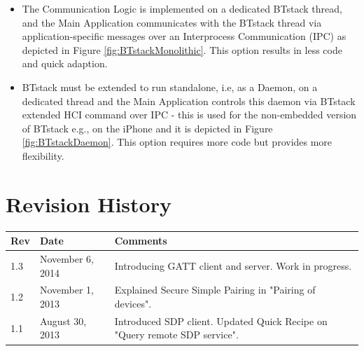 \documentclass[a4paper,titlepage,oneside,12pt]{amsart} %
\begin{document}
\begin{itemize}
\item The Communication Logic is implemented on a dedicated BTstack thread, and the Main Application communicates with the BTstack thread via application-specific messages over an Interprocess Communication (IPC) as depicted in Figure \ref{fig:BTstackMonolithic}. This option results in less code and quick adaption.
\item BTstack must be extended to run standalone, i.e, as a Daemon, on a dedicated thread and the Main Application controls this daemon via BTstack extended HCI command over IPC - this is used for the non-embedded version of BTstack e.g., on the iPhone and it is depicted in Figure \ref{fig:BTstackDaemon}. This option requires more code but provides more flexibility.
\end{itemize}


\pagebreak

\appendix
	    
	
	
	
	
	
	
	
	

\pagebreak

\section{Revision History}
\label{appendix:revision_history}

\begin{table}[!htbp]
\begin{tabular*}{\textwidth}{lp{3.5cm}p{8.5cm}}\toprule
Rev & Date & Comments\\ 
\midrule
1.3 & November 6, 2014 & Introducing GATT client and server. Work in progress.\\
1.2 & November 1, 2013 & Explained Secure Simple Pairing in "Pairing of devices".\\
1.1 & August 30, 2013 & Introduced SDP client. Updated Quick Recipe on "Query remote SDP service".\\
\bottomrule
\end{tabular*}
\end{table}

%
%
\end{document}
